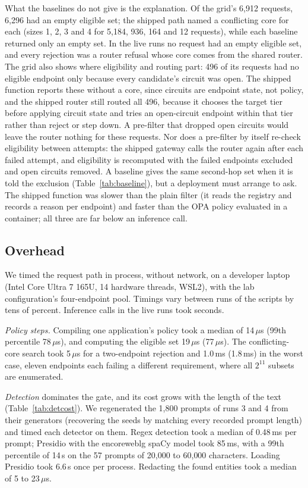 \documentclass[11pt]{article}
\newcommand{\ubreak}{\textunderscore\allowbreak}
\newcommand{\code}[1]{{\ttfamily\let\_\ubreak #1}}
\begin{document}
What the baselines do not give is the explanation. Of the grid's 6{,}912 requests, 6{,}296 had
an empty eligible set; the shipped path named a conflicting core for each (sizes 1, 2, 3 and 4
for 5{,}184, 936, 164 and 12 requests), while each baseline returned only an empty set. In the
live runs no request had an empty eligible set, and every rejection was a router refusal whose
core comes from the shared router. The grid also shows where eligibility and routing part:
496 of its requests had no eligible endpoint only because every candidate's circuit was open.
The shipped function reports these without a core, since circuits are endpoint state, not
policy, and the shipped router still routed all 496, because it chooses the target tier before
applying circuit state and tries an open-circuit endpoint within that tier rather than reject or
step down. A pre-filter that dropped open circuits would leave the router nothing for these
requests. Nor does a pre-filter by itself re-check eligibility between
attempts: the shipped gateway calls the router again after each failed attempt, and eligibility
is recomputed with the failed endpoints excluded and open circuits removed. A baseline gives the
same second-hop set when it is told the exclusion (Table~\ref{tab:baseline}), but a deployment
must arrange to ask. The shipped function was slower than the plain filter (it reads the
registry and records a reason per endpoint) and faster than the OPA policy evaluated in a
container; all three are far below an inference call.

\subsection{Overhead}
\label{sec:overhead}

We timed the request path in process, without network, on a developer laptop (Intel Core Ultra 7
165U, 14 hardware threads, WSL2), with the lab configuration's four-endpoint pool. Timings vary
between runs of the scripts by tens of percent. Inference calls in the live runs took seconds.

\emph{Policy steps.} Compiling one application's policy took a median of 14\,$\mu$s (99th
percentile 78\,$\mu$s), and computing the eligible set 19\,$\mu$s (77\,$\mu$s). The
conflicting-core search took 5\,$\mu$s for a two-endpoint rejection and 1.0\,ms (1.8\,ms) in the
worst case, eleven endpoints each failing a different requirement, where all $2^{11}$ subsets are
enumerated.

\emph{Detection} dominates the gate, and its cost grows with the length of the text
(Table~\ref{tab:detcost}). We regenerated the 1{,}800 prompts of runs 3 and 4 from their
generators (recovering the seeds by matching every recorded prompt length) and timed each
detector on them. Regex detection took a median of 0.48\,ms per prompt; Presidio with the
\code{en\_core\_web\_lg} spaCy model took 85\,ms, with a 99th percentile of 14\,s on the 57 prompts of 20{,}000 to
60{,}000 characters. Loading Presidio took 6.6\,s once per process. Redacting the found entities
took a median of 5 to 23\,$\mu$s.
\end{document}
